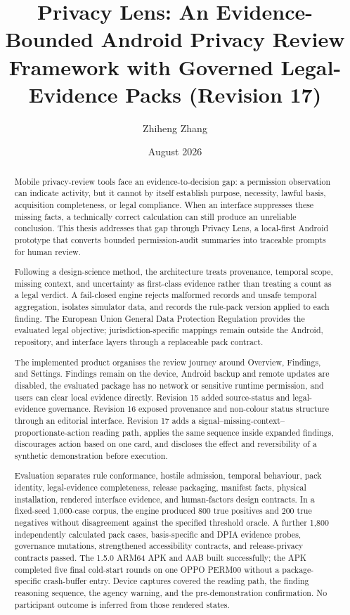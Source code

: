 \documentclass[11pt,a4paper]{article}
\title{Privacy Lens: An Evidence-Bounded Android Privacy Review Framework with Governed Legal-Evidence Packs (Revision 17)}
\author{Zhiheng Zhang}
\date{August 2026}
\begin{document}
\maketitle
\begin{abstract}
\small\singlespacing
Mobile privacy-review tools face an evidence-to-decision gap: a permission observation can indicate activity, but it cannot by itself establish purpose, necessity, lawful basis, acquisition completeness, or legal compliance. When an interface suppresses these missing facts, a technically correct calculation can still produce an unreliable conclusion. This thesis addresses that gap through Privacy Lens, a local-first Android prototype that converts bounded permission-audit summaries into traceable prompts for human review.

Following a design-science method, the architecture treats provenance, temporal scope, missing context, and uncertainty as first-class evidence rather than treating a count as a legal verdict. A fail-closed engine rejects malformed records and unsafe temporal aggregation, isolates simulator data, and records the rule-pack version applied to each finding. The European Union General Data Protection Regulation provides the evaluated legal objective; jurisdiction-specific mappings remain outside the Android, repository, and interface layers through a replaceable pack contract.

The implemented product organises the review journey around Overview, Findings, and Settings. Findings remain on the device, Android backup and remote updates are disabled, the evaluated package has no network or sensitive runtime permission, and users can clear local evidence directly. Revision 15 added source-status and legal-evidence governance. Revision 16 exposed provenance and non-colour status structure through an editorial interface. Revision 17 adds a signal--missing-context--proportionate-action reading path, applies the same sequence inside expanded findings, discourages action based on one card, and discloses the effect and reversibility of a synthetic demonstration before execution.

Evaluation separates rule conformance, hostile admission, temporal behaviour, pack identity, legal-evidence completeness, release packaging, manifest facts, physical installation, rendered interface evidence, and human-factors design contracts. In a fixed-seed 1,000-case corpus, the engine produced 800 true positives and 200 true negatives without disagreement against the specified threshold oracle. A further 1,800 independently calculated pack cases, basis-specific and DPIA evidence probes, governance mutations, strengthened accessibility contracts, and release-privacy contracts passed. The 1.5.0 ARM64 APK and AAB built successfully; the APK completed five final cold-start rounds on one OPPO PERM00 without a package-specific crash-buffer entry. Device captures covered the reading path, the finding reasoning sequence, the agency warning, and the pre-demonstration confirmation. No participant outcome is inferred from those rendered states.


\end{abstract}
\end{document}
